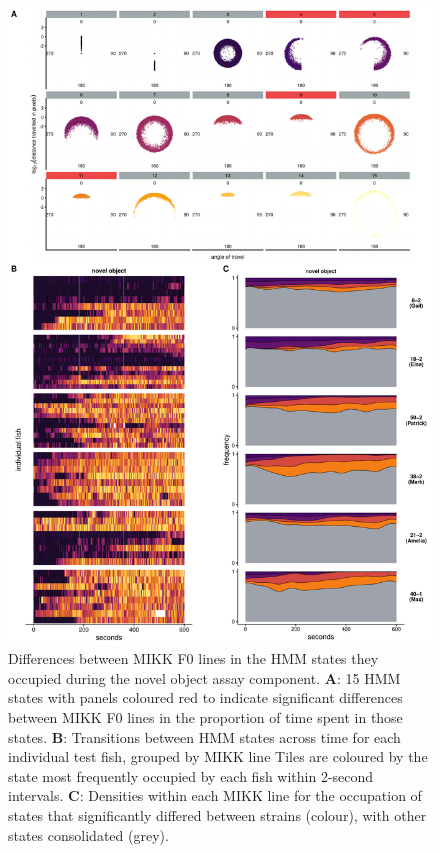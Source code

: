 \documentclass[
]{book}
\begin{document}
\begin{figure}
\includegraphics[width=1\linewidth]{figs/mikk_behaviour/select_0.08_15_sge_no} \caption{Differences between MIKK F0 lines in the HMM states they occupied during the novel object assay component. \textbf{A}: 15 HMM states with panels coloured red to indicate significant differences between MIKK F0 lines in the proportion of time spent in those states. \textbf{B}: Transitions between HMM states across time for each individual test fish, grouped by MIKK line Tiles are coloured by the state most frequently occupied by each fish within 2-second intervals. \textbf{C}: Densities within each MIKK line for the occupation of states that significantly differed between strains (colour), with other states consolidated (grey).}\label{fig:F2-time-sge-no}
\end{figure}
\end{document}
